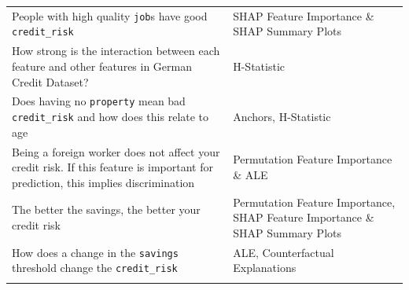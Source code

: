 \documentclass[
]{article}
\begin{document}
\begin{longtable}[]{@{}ll@{}}
\begin{minipage}[t]{0.47\columnwidth}
People with high quality \texttt{job}s have good \texttt{credit\_risk}\strut
\end{minipage} & \begin{minipage}[t]{0.47\columnwidth}\raggedright
SHAP Feature Importance \& SHAP Summary Plots\strut
\end{minipage}\tabularnewline
\begin{minipage}[t]{0.47\columnwidth}\raggedright
How strong is the interaction between each feature and other features in German Credit Dataset?\strut
\end{minipage} & \begin{minipage}[t]{0.47\columnwidth}\raggedright
H-Statistic\strut
\end{minipage}\tabularnewline
\begin{minipage}[t]{0.47\columnwidth}\raggedright
Does having no \texttt{property} mean bad \texttt{credit\_risk} and how does this relate to age\strut
\end{minipage} & \begin{minipage}[t]{0.47\columnwidth}\raggedright
Anchors, H-Statistic\strut
\end{minipage}\tabularnewline
\begin{minipage}[t]{0.47\columnwidth}\raggedright
Being a foreign worker does not affect your credit risk. If this feature is important for prediction, this implies discrimination\strut
\end{minipage} & \begin{minipage}[t]{0.47\columnwidth}\raggedright
Permutation Feature Importance \& ALE\strut
\end{minipage}\tabularnewline
\begin{minipage}[t]{0.47\columnwidth}\raggedright
The better the savings, the better your credit risk\strut
\end{minipage} & \begin{minipage}[t]{0.47\columnwidth}\raggedright
Permutation Feature Importance, SHAP Feature Importance \& SHAP Summary Plots\strut
\end{minipage}\tabularnewline
\begin{minipage}[t]{0.47\columnwidth}\raggedright
How does a change in the \texttt{savings} threshold change the \texttt{credit\_risk}\strut
\end{minipage} & \begin{minipage}[t]{0.47\columnwidth}\raggedright
ALE, Counterfactual Explanations\strut
\end{minipage}\tabularnewline
\begin{minipage}[t]{0.47\columnwidth}\raggedright

\end{minipage}
\end{longtable}
\end{document}

